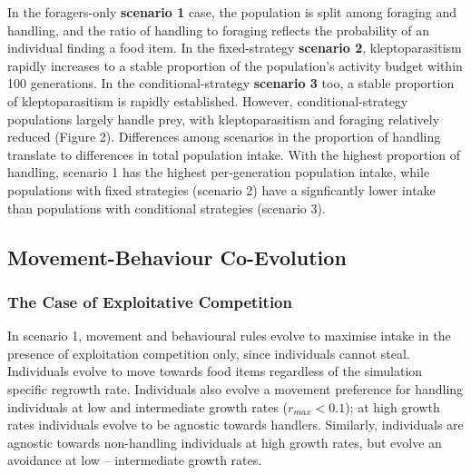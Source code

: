 \documentclass[11pt]{article}
\begin{document}
In the foragers-only \textbf{scenario 1} case, the population is split among foraging and handling, and the ratio of handling to foraging reflects the probability of an individual finding a food item.
In the fixed-strategy \textbf{scenario 2}, kleptoparasitism rapidly increases to a stable proportion of the population's activity budget within 100 generations.
In the conditional-strategy \textbf{scenario 3} too, a stable proportion of kleptoparasitism is rapidly established.
However, conditional-strategy populations largely handle prey, with kleptoparasitism and foraging relatively reduced (Figure 2).
Differences among scenarios in the proportion of handling translate to differences in total population intake.
With the highest proportion of handling, scenario 1 has the highest per-generation population intake, while populations with fixed strategies (scenario 2) have a signficantly lower intake than populations with conditional strategies (scenario 3).

\subsection{Movement-Behaviour Co-Evolution}

\subsubsection{The Case of Exploitative Competition}

In scenario 1, movement and behavioural rules evolve to maximise intake in the presence of exploitation competition only, since individuals cannot steal.
Individuals evolve to move towards food items regardless of the simulation specific regrowth rate.
Individuals also evolve a movement preference for handling individuals at low and intermediate growth rates ($r_{max} < 0.1$); at high growth rates individuals evolve to be agnostic towards handlers.
Similarly, individuals are agnostic towards non-handling individuals at high growth rates, but evolve an avoidance at low -- intermediate growth rates.
\end{document}
